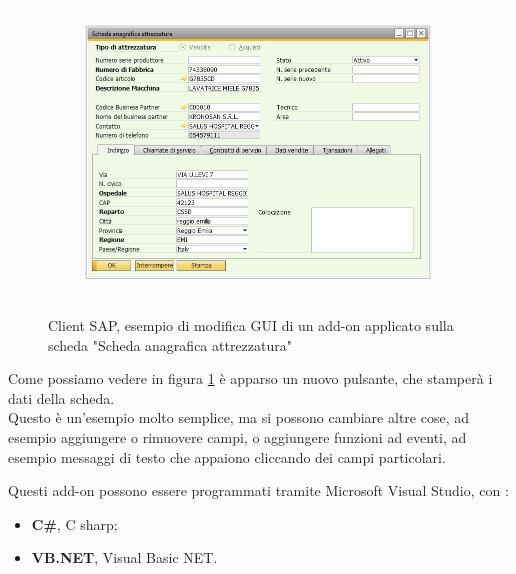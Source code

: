 \pagebreak
\begin{figure}[!h] 
	\centering 
	\includegraphics[scale = 0.6]{immagini/esempio-modifica-client-addon.jpg} 
	\caption {Client SAP, esempio di modifica GUI di un add-on applicato sulla scheda "Scheda anagrafica attrezzatura"}
	\label{fig:2-5}
\end{figure}
\begin{flushleft}
	\item Come possiamo vedere in figura \ref{fig:2-5} è apparso un nuovo pulsante, che stamperà i dati della scheda.\\Questo è un'esempio molto semplice, ma si possono cambiare altre cose, ad esempio aggiungere o rimuovere campi, o aggiungere funzioni ad eventi, ad esempio messaggi di testo che appaiono cliccando dei campi particolari.
	\item Questi add-on possono essere programmati tramite Microsoft Visual Studio, con :
	\begin{itemize}
		\item \textbf{C\#}, C sharp;
		\item \textbf{VB.NET}, Visual Basic NET.
	\end{itemize}
\end{flushleft}
\newpage
